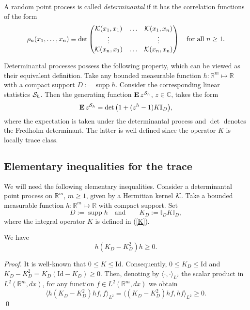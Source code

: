 \documentclass{article}
\numberwithin{equation}{section}
\newcommand{\mC}{\mathbb{C}}
\newcommand{\mR}{\mathbb{R}}
\newcommand{\mI}{\mathbb{I}}
\newcommand{\SSS}{{\cal S}}
\newcommand{\KK}{{\cal K}}
\newcommand{\supp}{\operatorname{supp}}
\newcommand{\MO}{\mbox{\bf E}\,}
\newcommand{\ran}{\rangle}
\newcommand{\lan}{\langle}
\newcommand{\qmb}{\quad\mbox}
\newcommand{\qu}{\quad}
\newcommand{\qnd}{\quad\mbox{and}\quad}
\newcommand{\lbl}{\label}
\newcommand{\bee}{\begin{equation}}
\newcommand{\eee}{\end{equation}}
\newcommand{\bpp}{\begin{prop}}
\newcommand{\epp}{\end{prop}}
\newcommand{\non}{\nonumber}
\begin{document}
\begin{defi} A random point process is called {\it determinantal}
if it has the correlation functions of the form
$$
\rho_n(x_1,\ldots,x_n)\equiv \det
\begin{pmatrix}
\KK(x_1,x_1)&\ldots& \KK(x_1,x_n) \\
\vdots& &\vdots \\
\KK(x_n,x_1) & \ldots & \KK(x_n,x_n)
\end{pmatrix} \qmb{for all }n\geq 1.
$$
\end{defi}
Determinantal processes possess the following property,
which can be viewed as their equivalent definition.
Take any bounded measurable function $h:\mR^m\mapsto \mR$
with a compact support $D:=\supp h$.
Consider the corresponding linear statistics $\SSS_h$.
Then the generating function $\MO z^{\SSS_h}$, $z\in\mC$, takes the form
\bee\lbl{Xar}
\MO z^{\SSS_h}= \det\big(1+ (z^{h}-1)K \mI_D\big),
\eee
where the expectation is taken under the determinantal process and $\det$ denotes the Fredholm determinant.
The latter is well-defined since the operator $K$ is locally trace class.




\subsection{Elementary inequalities for the trace}
\lbl{sec:basic}

We will need the following elementary inequalities.
Consider a determinantal point process on $\mR^m$, $m\geq 1$, given by a Hermitian kernel $\KK$.
Take a bounded measurable function $h: \mR^m\mapsto\mR$ with  compact support.
Set
$$
D:=\supp h
\qnd\qu
K_D:=\mI_D K \mI_D,
$$
where the integral operator $K$ is defined in (\ref{K}).
\bpp\lbl{K-K^2}
We have
\bee\non
h(K_D-K_D^2)h\geq 0.
\eee
\epp
{\it Proof.}
It is well-known that
$0 \leq K\leq \mbox{Id}$.
Consequently, $0 \leq K_D\leq \mbox{Id}$
and $K_D-K_D^2=K_D(\mbox{Id}-K_D)\geq 0$.
Then,
denoting by $\lan\cdot,\cdot\ran_{L^2}$ the scalar product in $L^2(\mR^m,dx)$,
for any function $f\in L^2(\mR^m,dx)$ we obtain
$$
\lan h(K_D-K_D^2)h f,f\ran_{L^2} = \lan(K_D-K_D^2)h f,h f\ran_{L^2}\geq 0.
$$
\qed
\end{document}
